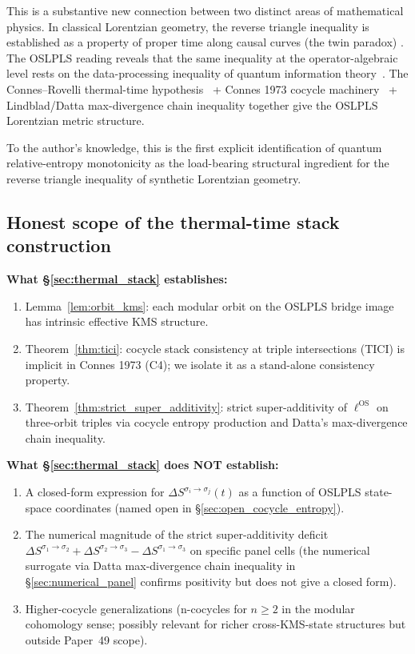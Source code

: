 \documentclass[11pt,a4paper]{article}
\theoremstyle{plain}
\theoremstyle{definition}
\newcommand{\ellOS}{\ell^{\mathrm{OS}}}
\newcommand{\DelS}[2]{\Delta S^{\sigma_{#1}\to\sigma_{#2}}}
\begin{document}
This is a substantive new connection between two distinct areas of
mathematical physics. In classical Lorentzian geometry, the reverse
triangle inequality is established as a property of proper time along
causal curves (the twin paradox)
\cite{kunzinger_samann2018,mondino_samann2025_pointed}. The OSLPLS
reading reveals that the same inequality at the operator-algebraic
level rests on the data-processing inequality of quantum information
theory~\cite{lindblad1975,uhlmann1977,wilde2017}. The
Connes--Rovelli thermal-time hypothesis~\cite{connes_rovelli1994} +
Connes 1973 cocycle machinery~\cite{connes1973} +
Lindblad/Datta max-divergence chain inequality together give the OSLPLS Lorentzian
metric structure.

To the author's knowledge, this is the first explicit identification
of quantum relative-entropy monotonicity as the load-bearing
structural ingredient for the reverse triangle inequality of synthetic
Lorentzian geometry.

\subsection{Honest scope of the thermal-time stack construction}
\label{sec:thermal_stack_scope}

\textbf{What \S\ref{sec:thermal_stack} establishes:}
\begin{enumerate}
\item Lemma~\ref{lem:orbit_kms}: each modular orbit on the OSLPLS
bridge image has intrinsic effective KMS structure.
\item Theorem~\ref{thm:tici}: cocycle stack consistency at triple
intersections (TICI) is implicit in Connes 1973 (C4); we isolate it as
a stand-alone consistency property.
\item Theorem~\ref{thm:strict_super_additivity}: strict
super-additivity of $\ellOS$ on three-orbit triples via cocycle
entropy production and Datta's max-divergence chain inequality.
\end{enumerate}

\textbf{What \S\ref{sec:thermal_stack} does NOT establish:}
\begin{enumerate}
\item A closed-form expression for $\DelS{i}{j}(t)$ as a function of
OSLPLS state-space coordinates (named open in
\S\ref{sec:open_cocycle_entropy}).
\item The numerical magnitude of the strict super-additivity deficit
$\DelS{1}{2}+\DelS{2}{3}-\DelS{1}{3}$ on specific panel cells (the
numerical surrogate via Datta max-divergence chain inequality in
\S\ref{sec:numerical_panel} confirms positivity but does not give a
closed form).
\item Higher-cocycle generalizations (n-cocycles for $n\ge 2$ in the
modular cohomology sense; possibly relevant for richer cross-KMS-state
structures but outside Paper~49 scope).
\end{enumerate}
\end{document}
